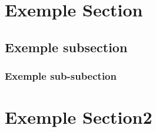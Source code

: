 \documentclass{template}
\begin{document}
\fairepagedegarde
\fairetabledesmatieres


\section{Exemple Section}

\subsection{Exemple subsection}

\subsubsection{Exemple sub-subection}


\section{Exemple Section2}


\insererbiblio 
\end{document}
